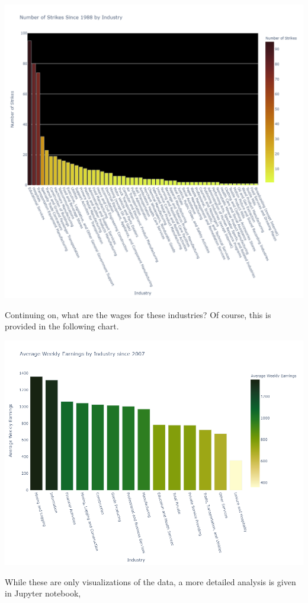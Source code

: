 \documentclass[reqno,11pt]{amsart}
\begin{document}
\includegraphics[width=1\textwidth]{strikesByIndustry.png}

Continuing on, what are the wages for these industries? Of course, this is provided in
the following chart.

\includegraphics[width=1\textwidth]{industryWages.png}

While these are only visualizations of the data, a more detailed analysis is given in
Jupyter notebook,
\end{document}

